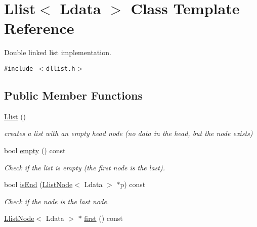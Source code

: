 \hypertarget{classLlist}{
\section{Llist$<$ Ldata $>$ Class Template Reference}
\label{classLlist}
}
Double linked list implementation.  


{\tt \#include $<$dllist.h$>$}

\subsection*{Public Member Functions}
\begin{CompactItemize}
\item 
\hypertarget{classLlist_80be9511479463e949f442a22e48c064}{
\hyperlink{classLlist_80be9511479463e949f442a22e48c064}{Llist} ()}
\label{classLlist_80be9511479463e949f442a22e48c064}

\begin{CompactList}\small\item\em creates a list with an empty head node (no data in the head, but the node exists) \item\end{CompactList}\item 
\hypertarget{classLlist_6a139c360a8687527ebd74a27ff77ec2}{
bool \hyperlink{classLlist_6a139c360a8687527ebd74a27ff77ec2}{empty} () const }
\label{classLlist_6a139c360a8687527ebd74a27ff77ec2}

\begin{CompactList}\small\item\em Check if the list is empty (the first node is the last). \item\end{CompactList}\item 
\hypertarget{classLlist_a02016d71082697d45b3d0dcd5ce1343}{
bool \hyperlink{classLlist_a02016d71082697d45b3d0dcd5ce1343}{isEnd} (\hyperlink{classLlistNode}{LlistNode}$<$ Ldata $>$ $\ast$p) const }
\label{classLlist_a02016d71082697d45b3d0dcd5ce1343}

\begin{CompactList}\small\item\em Check if the node is the last node. \item\end{CompactList}\item 
\hypertarget{classLlist_91f735ef2924ff78864157c2434c81e3}{
\hyperlink{classLlistNode}{LlistNode}$<$ Ldata $>$ $\ast$ \hyperlink{classLlist_91f735ef2924ff78864157c2434c81e3}{first} () const }
\label{classLlist_91f735ef2924ff78864157c2434c81e3}


\end{CompactItemize}
